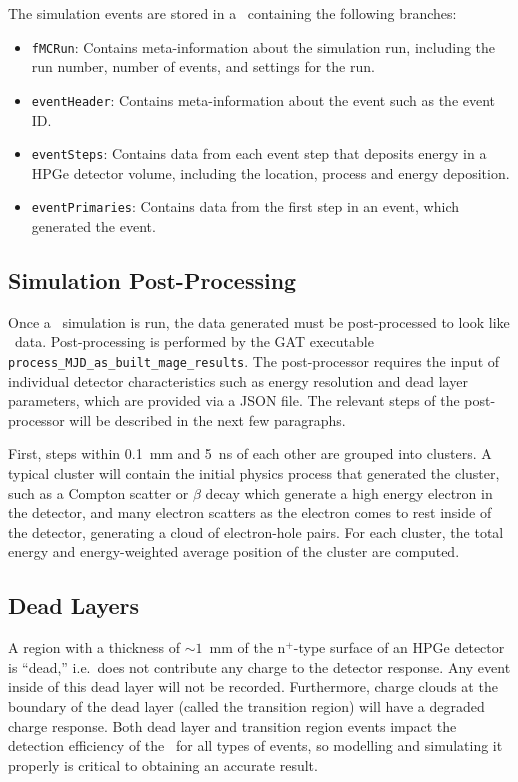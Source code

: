 \documentclass[/main.tex]{subfiles}
\begin{document}
The simulation events are stored in a \TTree\ containing the following branches:
\begin{itemize}
\item{\texttt{fMCRun}:}
  Contains meta-information about the simulation run, including the run number, number of events, and settings for the run.
\item{\texttt{eventHeader}:}
  Contains meta-information about the event such as the event ID.
\item{\texttt{eventSteps}:}
  Contains data from each event step that deposits energy in a HPGe detector volume, including the location, process and energy deposition.
\item{\texttt{eventPrimaries}:}
  Contains data from the first step in an event, which generated the event.
\end{itemize}

\subsection{Simulation Post-Processing} \label{sec:simpostproc}
Once a \Mage\ simulation is run, the data generated must be post-processed to look like \MJD\ data.
Post-processing is performed by the GAT executable \texttt{process\_MJD\_as\_built\_mage\_results}.
The post-processor requires the input of individual detector characteristics such as energy resolution and dead layer parameters, which are provided via a JSON file.
The relevant steps of the post-processor will be described in the next few paragraphs.

First, steps within 0.1~mm and 5~ns of each other are grouped into clusters.
A typical cluster will contain the initial physics process that generated the cluster, such as a Compton scatter or $\beta$ decay which generate a high energy electron in the detector, and many electron scatters as the electron comes to rest inside of the detector, generating a cloud of electron-hole pairs.
For each cluster, the total energy and energy-weighted average position of the cluster are computed.

\subsection{Dead Layers}\label{sec:deadlayers}
A region with a thickness of $\sim1$~mm of the n$^+$-type surface of an HPGe detector is ``dead,'' i.e.~does not contribute any charge to the detector response.
Any event inside of this dead layer will not be recorded.
Furthermore, charge clouds at the boundary of the dead layer (called the transition region) will have a degraded charge response.
Both dead layer and transition region events impact the detection efficiency of the \MJD\ for all types of events, so modelling and simulating it properly is critical to obtaining an accurate result.
\end{document}

